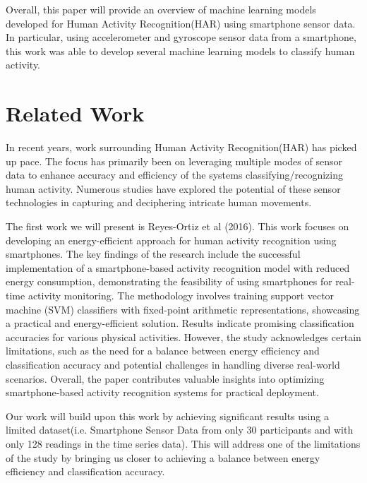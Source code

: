\documentclass[conference]{IEEEtran}
\begin{document}
Overall, this paper will provide an overview of machine learning models developed for Human Activity Recognition(HAR) using smartphone sensor data. In particular, using accelerometer and gyroscope sensor data from a smartphone, this work was able to develop several machine learning models to classify human activity. 

\section{Related Work}
In recent years, work surrounding Human Activity Recognition(HAR) has picked up pace. The focus has primarily been on leveraging multiple modes of sensor data to enhance accuracy and efficiency of the systems classifying/recognizing human activity. Numerous studies have explored the potential of these sensor technologies in capturing and deciphering intricate human movements. \newline 

The first work we will present is Reyes-Ortiz et al (2016). This work focuses on developing an energy-efficient approach for human activity recognition using smartphones. The key findings of the research include the successful implementation of a smartphone-based activity recognition model with reduced energy consumption, demonstrating the feasibility of using smartphones for real-time activity monitoring. The methodology involves training support vector machine (SVM) classifiers with fixed-point arithmetic representations, showcasing a practical and energy-efficient solution. Results indicate promising classification accuracies for various physical activities. However, the study acknowledges certain limitations, such as the need for a balance between energy efficiency and classification accuracy and potential challenges in handling diverse real-world scenarios. Overall, the paper contributes valuable insights into optimizing smartphone-based activity recognition systems for practical deployment. \newline

Our work will build upon this work by achieving significant results using a limited dataset(i.e. Smartphone Sensor Data from only 30 participants and with only 128 readings in the time series data). This will address one of the limitations of the study by bringing us closer to achieving a balance between energy efficiency and classification accuracy. \newline 
\end{document}

